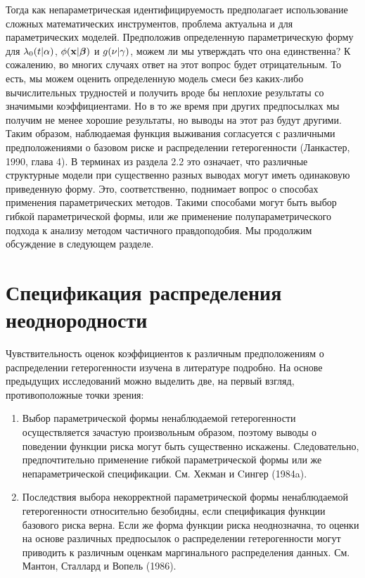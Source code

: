 Тогда как непараметрическая идентифицируемость предполагает использование сложных математических инструментов, проблема актуальна и для параметрических моделей. Предположив определенную параметрическую форму для $\lambda_0(t|\alpha)$, $\phi(\mathbf{x}|\bm{\beta})$ и $g(\nu|\gamma)$, можем ли мы утверждать что она единственна? К сожалению, во многих случаях ответ на этот вопрос будет отрицательным. То есть, мы можем оценить определенную модель смеси без каких-либо вычислительных трудностей и получить вроде бы неплохие результаты со значимыми коэффициентами. Но в то же время при других предпосылках мы получим не менее хорошие результаты, но выводы на этот раз будут другими. Таким образом, наблюдаемая функция выживания согласуется с различными предположениями о базовом риске и распределении гетерогенности (Ланкастер, 1990, глава 4). В терминах из раздела 2.2 %
это означает, что различные структурные модели при существенно разных выводах могут иметь одинаковую приведенную форму. Это, соответственно, поднимает вопрос о способах применения параметрических методов. Такими способами могут быть выбор гибкой параметрической формы, или же применение полупараметрического подхода к анализу методом частичного правдоподобия. Мы продолжим обсуждение в следующем разделе.




\section{Спецификация распределения неоднородности}\label{sec:18.4}

\noindent
Чувствительность оценок коэффициентов к различным предположениям о распределении гетерогенности изучена в литературе подробно. На основе предыдущих исследований можно выделить две, на первый взгляд, противоположные точки зрения:

\begin{enumerate}
    \item
Выбор параметрической формы ненаблюдаемой гетерогенности осуществляется зачастую произвольным образом, поэтому выводы о поведении функции риска могут быть существенно искажены. Следовательно, предпочтительно применение гибкой параметрической формы или же непараметрической спецификации. См. Хекман и Cингер (1984a).

    \item
Последствия выбора некорректной параметрической формы ненаблюдаемой гетерогенности относительно безобидны, если спецификация функции базового риска верна. Если же форма функции риска неоднозначна, то оценки на основе различных предпосылок о распределении гетерогенности могут приводить к различным оценкам маргинального распределения данных. См. Мантон, Сталлард и Вопель (1986).
\end{enumerate}

